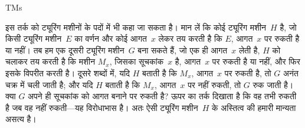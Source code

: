 \documentclass[../../../include/open-logic-section]{subfiles}
\begin{document}
\begin{tagblock}{TMs}
\begin{explain}
इस तर्क को ट्यूरिंग मशीनों के पदों में भी कहा जा सकता है। मान लें कि
कोई ट्यूरिंग मशीन~$H$ है, जो किसी ट्यूरिंग मशीन~$E$ का वर्णन और कोई
आगत~$x$ लेकर तय करती है कि $E$, आगत~$x$ पर रुकती है या नहीं। तब हम एक
दूसरी ट्यूरिंग मशीन~$G$ बना सकते हैं, जो एक ही आगत~$x$ लेती है, $H$ को
चलाकर तय करती है कि मशीन $M_x$, जिसका सूचकांक~$x$ है, आगत~$x$ पर रुकती है या
नहीं, और फिर इसके विपरीत करती है। दूसरे शब्दों में, यदि $H$ बताती है कि
$M_x$, आगत~$x$ पर रुकती है, तो $G$ अनंत चक्र में चली जाती है; और यदि
$H$ बताती है कि $M_x$, आगत~$x$ पर नहीं रुकती, तो $G$ रुक जाती है। क्या
$G$ अपने ही सूचकांक को आगत बनाने पर रुकती है? ऊपर का तर्क दिखाता है कि
वह तभी रुकती है जब वह नहीं रुकती---यह विरोधाभास है। अतः ऐसी ट्यूरिंग
मशीन~$H$ के अस्तित्व की हमारी मान्यता असत्य है।
\end{explain}
\end{tagblock}
\end{document}
